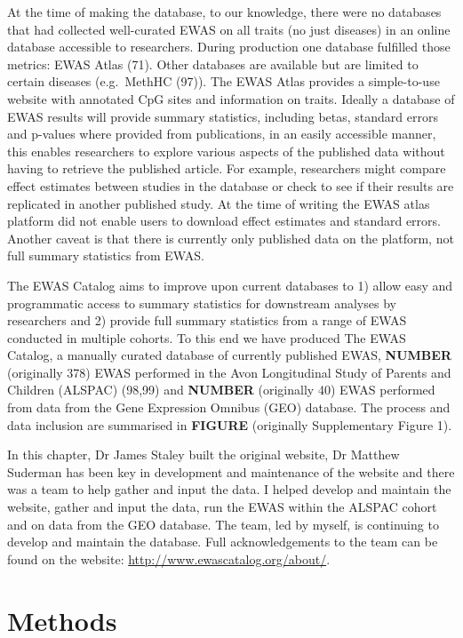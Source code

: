 \documentclass[11pt,twoside]{bristolthesis}
\begin{document}
At the time of making the database, to our knowledge, there were no databases that had collected well-curated EWAS on all traits (no just diseases) in an online database accessible to researchers. During production one database fulfilled those metrics: EWAS Atlas (71). Other databases are available but are limited to certain diseases (e.g.~MethHC (97)). The EWAS Atlas provides a simple-to-use website with annotated CpG sites and information on traits. Ideally a database of EWAS results will provide summary statistics, including betas, standard errors and p-values where provided from publications, in an easily accessible manner, this enables researchers to explore various aspects of the published data without having to retrieve the published article. For example, researchers might compare effect estimates between studies in the database or check to see if their results are replicated in another published study. At the time of writing the EWAS atlas platform did not enable users to download effect estimates and standard errors. Another caveat is that there is currently only published data on the platform, not full summary statistics from EWAS.

The EWAS Catalog aims to improve upon current databases to 1) allow easy and programmatic access to summary statistics for downstream analyses by researchers and 2) provide full summary statistics from a range of EWAS conducted in multiple cohorts. To this end we have produced The EWAS Catalog, a manually curated database of currently published EWAS, \textbf{NUMBER} (originally 378) EWAS performed in the Avon Longitudinal Study of Parents and Children (ALSPAC) (98,99) and \textbf{NUMBER} (originally 40) EWAS performed from data from the Gene Expression Omnibus (GEO) database. The process and data inclusion are summarised in \textbf{FIGURE} (originally Supplementary Figure 1).

In this chapter, Dr James Staley built the original website, Dr Matthew Suderman has been key in development and maintenance of the website and there was a team to help gather and input the data. I helped develop and maintain the website, gather and input the data, run the EWAS within the ALSPAC cohort and on data from the GEO database. The team, led by myself, is continuing to develop and maintain the database. Full acknowledgements to the team can be found on the website: \url{http://www.ewascatalog.org/about/}.

\hypertarget{methods-1}{%
\section{Methods}\label{methods-1}}
\end{document}
